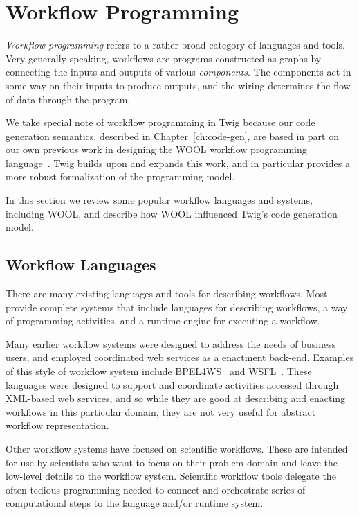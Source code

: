 
\section{Workflow Programming}
\label{sec:bg:workflow}

\emph{Workflow programming} refers to a rather broad category of
languages and tools. Very generally speaking, workflows are
programs constructed as graphs by connecting the inputs and
outputs of various \emph{components}. The components act in some
way on their inputs to produce outputs, and the wiring determines
the flow of data through the program.

We take special note of workflow programming in Twig because our
code generation semantics, described in
Chapter~\ref{ch:code-gen}, are based in part on our own previous
work in designing the WOOL workflow programming
language~\cite{wool}. Twig builds upon and expands this
work, and in particular provides a more robust formalization of
the programming model.

In this section we review some popular workflow languages and
systems, including WOOL, and describe how WOOL influenced Twig's
code generation model.

\subsection{Workflow Languages}

There are many existing languages and tools for describing
workflows. Most provide complete systems that include languages
for describing workflows, a way of programming activities, and a
runtime engine for executing a workflow.

Many earlier workflow systems were designed to address the needs
of business users, and employed coordinated web services as a
enactment back-end. Examples of this style of workflow system
include BPEL4WS~\cite{andrews03bpel} and
WSFL~\cite{leymann01wsfl}. These languages were designed to
support and coordinate activities accessed through XML-based web
services, and so while they are good at describing and enacting
workflows in this particular domain, they are not very useful for
abstract workflow representation.

Other workflow systems have focused on scientific workflows. These
are intended for use by scientists who want to focus on their
problem domain and leave the low-level details to the workflow
system. Scientific workflow tools delegate the often-tedious
programming needed to connect and orchestrate series of
computational steps to the language and/or runtime system.

